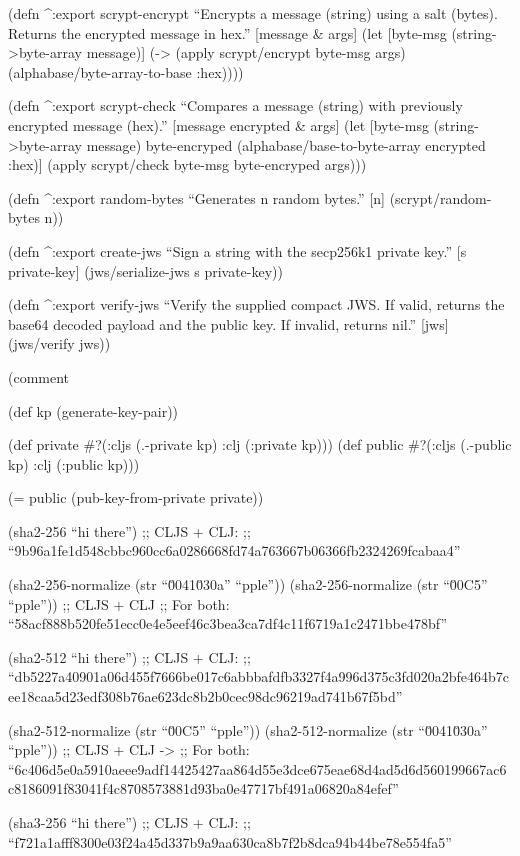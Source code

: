 \documentclass[
]{article}
\begin{document}
(defn \^{}:export scrypt-encrypt ``Encrypts a message (string) using a
salt (bytes). Returns the encrypted message in hex.'' {[}message \&
args{]} (let {[}byte-msg (string-\textgreater byte-array message){]}
(-\textgreater{} (apply scrypt/encrypt byte-msg args)
(alphabase/byte-array-to-base :hex))))

(defn \^{}:export scrypt-check ``Compares a message (string) with
previously encrypted message (hex).'' {[}message encrypted \& args{]}
(let {[}byte-msg (string-\textgreater byte-array message) byte-encryped
(alphabase/base-to-byte-array encrypted :hex){]} (apply scrypt/check
byte-msg byte-encryped args)))

(defn \^{}:export random-bytes ``Generates n random bytes.'' {[}n{]}
(scrypt/random-bytes n))

(defn \^{}:export create-jws ``Sign a string with the secp256k1 private
key.'' {[}s private-key{]} (jws/serialize-jws s private-key))

(defn \^{}:export verify-jws ``Verify the supplied compact JWS. If
valid, returns the base64 decoded payload and the public key. If
invalid, returns nil.'' {[}jws{]} (jws/verify jws))

(comment

(def kp (generate-key-pair))

(def private \#?(:cljs (.-private kp) :clj (:private kp))) (def public
\#?(:cljs (.-public kp) :clj (:public kp)))

(= public (pub-key-from-private private))

(sha2-256 ``hi there'') ;; CLJS + CLJ: ;;
``9b96a1fe1d548cbbc960cc6a0286668fd74a763667b06366fb2324269fcabaa4''

(sha2-256-normalize (str ``\u0041\u030a'' ``pple'')) (sha2-256-normalize
(str ``\u00C5'' ``pple'')) ;; CLJS + CLJ ;; For both:
``58acf888b520fe51ecc0e4e5eef46c3bea3ca7df4c11f6719a1c2471bbe478bf''

(sha2-512 ``hi there'') ;; CLJS + CLJ: ;;
``db5227a40901a06d455f7666be017c6abbbafdfb3327f4a996d375c3fd020a2bfe464b7cee18caa5d23edf308b76ae623dc8b2b0cec98dc96219ad741b67f5bd''

(sha2-512-normalize (str ``\u00C5'' ``pple'')) (sha2-512-normalize (str
``\u0041\u030a'' ``pple'')) ;; CLJS + CLJ -\textgreater{} ;; For both:
``6c406d5e0a5910aeee9adf14425427aa864d55e3dce675eae68d4ad5d6d560199667ac6c8186091f83041f4c8708573881d93ba0e47717bf491a06820a84efef''

(sha3-256 ``hi there'') ;; CLJS + CLJ: ;;
``f721a1afff8300e03f24a45d337b9a9aa630ca8b7f2b8dca94b44be78e554fa5''
\end{document}
